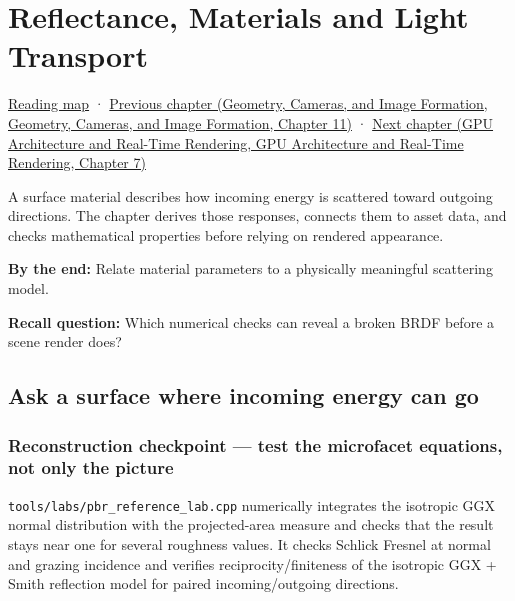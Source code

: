 \hypertarget{03-visual-computing-i-ch005}{}
\chapter{Reflectance, Materials and Light Transport}\label{stagechapter:03-visual-computing-i-ch005}\label{03-visual-computing-i-ch005-reflectance-materials-and-light-transport}

\hyperref[volume-reading-map]{Reading map} · \href{../03-Geometry-Cameras-and-Image-Formation/main.pdf\#nameddest=03-visual-computing-i-ch004-sampling-filtering-and-reconstruction}{Previous chapter (Geometry, Cameras, and Image Formation, Geometry, Cameras, and Image Formation, Chapter 11)} · \href{../06-GPU-Architecture-and-Real-Time-Rendering/main.pdf\#nameddest=03-visual-computing-i-ch006-from-material-data-to-gpu-bindings}{Next chapter (GPU Architecture and Real-Time Rendering, GPU Architecture and Real-Time Rendering, Chapter 7)}

A surface material describes how incoming energy is scattered toward outgoing directions. The chapter derives those responses, connects them to asset data, and checks mathematical properties before relying on rendered appearance.

\textbf{By the end:} Relate material parameters to a physically meaningful scattering model.

\textbf{Recall question:} Which numerical checks can reveal a broken BRDF before a scene render does?

\section{Ask a surface where incoming energy can go}\label{03-visual-computing-i-ch005-ask-a-surface-where-incoming-energy-can-go}

\subsection{Reconstruction checkpoint --- test the microfacet equations, not only the picture}\label{03-visual-computing-i-ch005-reconstruction-checkpoint-test-the-microfacet-equations-not-only-the-picture}

\texttt{tools/labs/pbr\_reference\_lab.cpp} numerically integrates the isotropic GGX normal distribution with the projected-area measure and checks that the result stays near one for several roughness values. It checks Schlick Fresnel at normal and grazing incidence and verifies reciprocity/finiteness of the isotropic GGX + Smith reflection model for paired incoming/outgoing directions.


